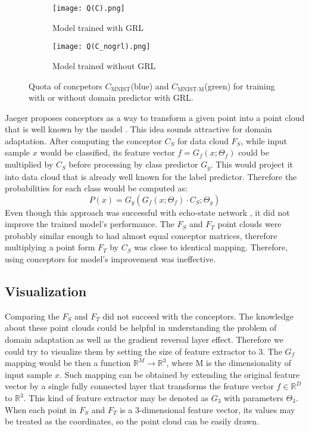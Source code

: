 \documentclass[shortabstract, inz, english]{iithesis}
\DeclareMathOperator{\QCM}{MNIST}
\DeclareMathOperator{\QCMM}{MNIST-M}
\newcommand{\CM}{$C_{\QCM}$}
\newcommand{\CMM}{$C_{\QCMM}$}
\begin{document}
\begin{figure}
    \centering
    \begin{subfigure}[b]{0.48\textwidth}
        \texttt{[image: Q(C).png]}
        \caption{Model trained with GRL}
    \end{subfigure}%
    \begin{subfigure}[b]{0.48\textwidth}
        \texttt{[image: Q(C\_nogrl).png]}
        \caption{Model trained without GRL}
    \end{subfigure}%
    \caption{Quota of concpetors \CM (blue) and \CMM (green) for training with or without domain predictor with GRL.}%
    \label{fig:Q(C)}%
\end{figure}
\par
Jaeger proposes conceptors as a way to transform a given point into a point cloud that is well known by the model \cite{conc}. This idea sounds attractive for domain adaptation. After computing the conceptor $C_{S}$ for data cloud $F_{S}$, while input sample $x$ would be classified, its feature vector $f = G_{f}(x ; \Theta_{f})$ could be multiplied by $C_{S}$ before processing by class predictor $G_{y}$. This would project it into data cloud that is already well known for the label predictor. Therefore the probabilities for each class would be computed as:
\begin{equation*}
  P(x) =  G_{y}( G_{f}( x ; \Theta_{f} ) \cdot C_{S} ; \Theta_{y} )    
\end{equation*}
Even though this approach was successful with echo-state network \cite{conc}, it did not improve the trained model's performance. The $F_{S}$ and $F_{T}$ point clouds were probably similar enough to had almost equal conceptor matrices, therefore multiplying a point form $F_{T}$ by $C_{S}$ was close to identical mapping. Therefore, using conceptors for model's improvement was ineffective.

\subsection{Visualization}
Comparing the $F_{S}$ and $F_{T}$ did not succeed with the conceptors. The knowledge about these point clouds could be helpful in understanding the problem of domain adaptation as well as the gradient reversal layer effect. Therefore we could try to visualize them by setting the size of feature extractor to 3. The $G_{f}$ mapping would be then a function $\mathbb{R}^{M} \rightarrow \mathbb{R}^{3}$, where M is the dimensionality of input sample $x$. Such mapping can be obtained by extending the original feature vector by a single fully connected layer that transforms the feature vector $f \in \mathbb{R}^{D}$ to $\mathbb{R}^{3}$. This kind of feature extractor may be denoted as $G_{3}$ with parameters $\Theta_{3}$. When each point in $F_{S}$ and $F_{T}$ is a 3-dimensional feature vector, its values may be treated as the coordinates, so the point cloud can be easily drawn.
\end{document}
